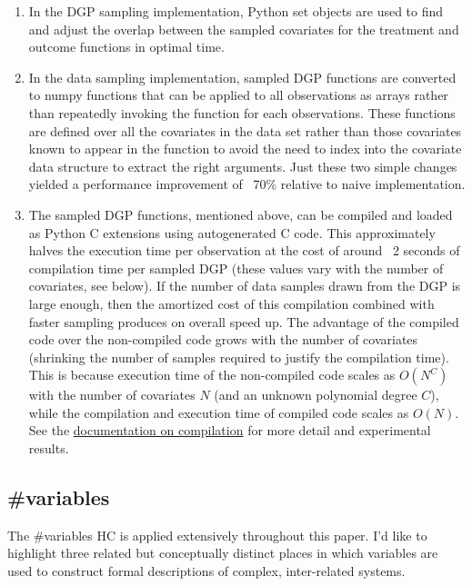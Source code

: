 \documentclass[./main.tex]{subfiles}
\begin{document}
\begin{enumerate}
    \item In the DGP sampling implementation, Python set objects are used to find and adjust the overlap between the sampled covariates for the treatment and outcome functions in optimal time.
    
    \item In the data sampling implementation, sampled DGP functions are converted to numpy functions that can be applied to all observations as arrays rather than repeatedly invoking the function for each observations. These functions are defined over all the covariates in the data set rather than those covariates known to appear in the function to avoid the need to index into the covariate data structure to extract the right arguments. Just these two simple changes yielded a performance improvement of ~70\% relative to naive implementation.
    
    \item The sampled DGP functions, mentioned above, can be compiled and loaded as Python C extensions using autogenerated C code. This approximately halves the execution time per observation at the cost of around ~2 seconds of compilation time per sampled DGP (these values vary with the number of covariates, see below). If the number of data samples drawn from the DGP is large enough, then the amortized cost of this compilation combined with faster sampling produces on overall speed up. The advantage of the compiled code over the non-compiled code grows with the number of covariates (shrinking the number of samples required to justify the compilation time). This is because execution time of the non-compiled code scales as $O(N^C)$ with the number of covariates $N$ (and an unknown polynomial degree $C$), while the compilation and execution time of compiled code scales as $O(N)$. See the \href{\RTDurl/advanced/parallelization.html}{documentation on compilation} for more detail and experimental results.
    
\end{enumerate}


\subsection{\textbf{\#variables}}
\label{hc:variables}

The \#variables HC is applied extensively throughout this paper. I'd like to highlight three related but conceptually distinct places in which variables are used to construct formal descriptions of complex, inter-related systems.
\end{document}
